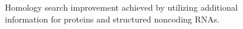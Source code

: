 \documentclass[custom,landscape,final,30pt,plainboxedsections]{sciposter-titleskipsmall}
\begin{document}
\begin{multicols}{3}
\begin{footnotesize}
\begin{figure}
\caption{
Homology search improvement achieved by utilizing additional
information for proteins and structured noncoding RNAs.}
\label{fig:examples}
\end{figure}
\end{footnotesize}


\end{multicols}
\end{document}
